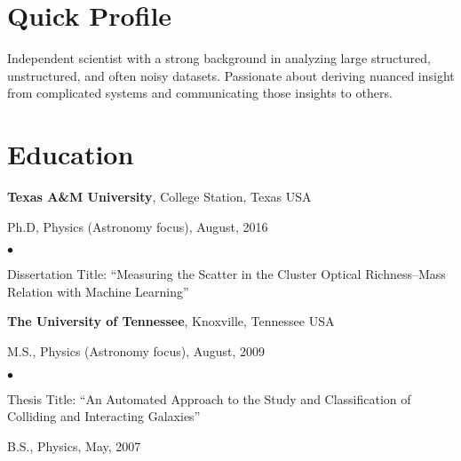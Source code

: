 \documentclass[margin,line, 10pt]{res}
\newenvironment{list1}{
  \begin{list}{\ding{113}}{%
      \setlength{\itemsep}{0in}
      \setlength{\parsep}{0in} \setlength{\parskip}{0in}
      \setlength{\topsep}{0in} \setlength{\partopsep}{0in} 
      \setlength{\leftmargin}{0.17in}}}{\end{list}}
\newenvironment{list2}{
  \begin{list}{$\bullet$}{%
      \setlength{\itemsep}{0in}
      \setlength{\parsep}{0in} \setlength{\parskip}{0in}
      \setlength{\topsep}{0in} \setlength{\partopsep}{0in} 
      \setlength{\leftmargin}{0.2in}}}{\end{list}}
\begin{document}
\begin{resume}
\section{Quick Profile}
Independent scientist with a strong background in analyzing large structured, unstructured, and often noisy datasets. Passionate about deriving nuanced insight from complicated systems and communicating those insights to others. 
\vspace*{-5mm}

\section{Education}
\textbf{Texas A\&M University}, College Station, Texas USA\\
\vspace*{-5mm}
\begin{list1}
	\item[]Ph.D, Physics (Astronomy focus), August, 2016
	\begin{list2}
		\item Dissertation Title: ``Measuring the Scatter in the Cluster Optical Richness--Mass Relation with Machine Learning'' 
	\end{list2}
\end{list1}
\vspace*{-5mm}

\textbf{The University of Tennessee}, Knoxville, Tennessee USA\\
\vspace*{-5mm}
\begin{list1}
	\item[] M.S., Physics (Astronomy focus),  August, 2009
	\begin{list2}
		\item Thesis Title: ``An Automated Approach to the Study and Classification of Colliding and Interacting Galaxies''
	\end{list2}
	\item[] B.S., Physics,  May, 2007
\end{list1}
\vspace*{-5mm}


\end{resume}
\end{document}
